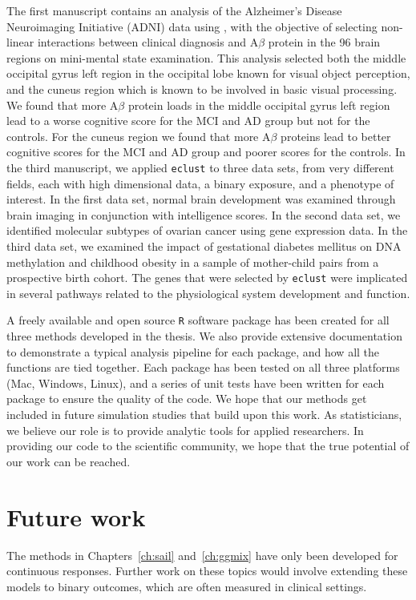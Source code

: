 The first manuscript contains an analysis of the Alzheimer's Disease Neuroimaging Initiative (ADNI) data using \sail, with the objective of selecting non-linear interactions between clinical diagnosis and A$\beta$ protein in the 96 brain regions on mini-mental state examination. This analysis selected both the middle occipital gyrus left region in the occipital lobe known for visual object perception, and the cuneus region which is known to be involved in basic visual processing. We found that more A$\beta$ protein loads in the middle occipital gyrus left region lead to a worse cognitive score for the MCI and AD group but not for the controls. For the cuneus region we found that more A$\beta$ proteins lead to better cognitive scores for the MCI and AD group and poorer scores for the controls. In the third manuscript, we applied \texttt{eclust} to three data sets, from very different fields, each with high dimensional data, a binary exposure, and a phenotype of interest. In the first data set, normal brain development was examined through brain imaging in conjunction with intelligence scores. In the second data set, we identified molecular subtypes of ovarian cancer using gene expression data. In the third data set, we examined the impact of gestational diabetes mellitus on DNA methylation and childhood obesity in a sample of mother-child pairs from a prospective birth cohort. The genes that were selected by \texttt{eclust} were implicated in several pathways related to the physiological system development and function.

A freely available and open source \texttt{R} software package has been created for all three methods developed in the thesis. We also provide extensive documentation to demonstrate a typical analysis pipeline for each package, and how all the functions are tied together. Each package has been tested on all three platforms (Mac, Windows, Linux), and a series of unit tests have been written for each package to ensure the quality of the code. We hope that our methods get included in future simulation studies that build upon this work. As statisticians, we believe our role is to provide analytic tools for applied researchers. In providing our code to the scientific community, we hope that the true potential of our work can be reached. 


\section{Future work}

The methods in Chapters~\ref{ch:sail} and~\ref{ch:ggmix} have only been developed for continuous responses. Further work on these topics would involve extending these models to binary outcomes, which are often measured in clinical settings. 

